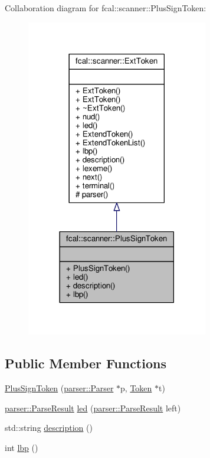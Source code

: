 Collaboration diagram for fcal\+:\+:scanner\+:\+:Plus\+Sign\+Token\+:
\nopagebreak
\begin{figure}[H]
\begin{center}
\leavevmode
\includegraphics[width=225pt]{classfcal_1_1scanner_1_1PlusSignToken__coll__graph}
\end{center}
\end{figure}
\subsection*{Public Member Functions}
\begin{DoxyCompactItemize}
\item 
\hyperlink{classfcal_1_1scanner_1_1PlusSignToken_a7bd4963a7e9fe37917007800abdd1225}{Plus\+Sign\+Token} (\hyperlink{classfcal_1_1parser_1_1Parser}{parser\+::\+Parser} $\ast$p, \hyperlink{classfcal_1_1scanner_1_1Token}{Token} $\ast$t)
\item 
\hyperlink{classfcal_1_1parser_1_1ParseResult}{parser\+::\+Parse\+Result} \hyperlink{classfcal_1_1scanner_1_1PlusSignToken_a7926bacb09c71d87642eb9d76cce5fc3}{led} (\hyperlink{classfcal_1_1parser_1_1ParseResult}{parser\+::\+Parse\+Result} left)
\item 
std\+::string \hyperlink{classfcal_1_1scanner_1_1PlusSignToken_a7039658eea598ecfb46084a0b496544f}{description} ()
\item 
int \hyperlink{classfcal_1_1scanner_1_1PlusSignToken_a12eb801f806ba7bcb2e0c9f4eba9c98c}{lbp} ()
\end{DoxyCompactItemize}
